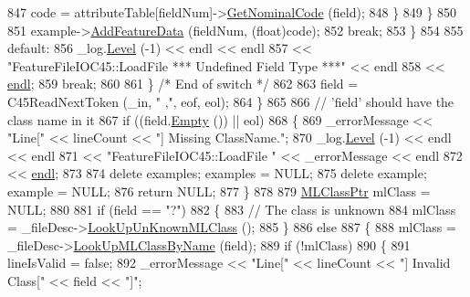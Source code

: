 \begin{DoxyCode}
847             code = attributeTable[fieldNum]->\hyperlink{class_k_k_m_l_l_1_1_attribute_adc5bad6931d6c3f4aea6e1ad5c42b1f1}{GetNominalCode} (field);
848           \}
849         \}
850 
851         example->\hyperlink{class_k_k_m_l_l_1_1_feature_vector_abf364e3348c041cd7be6f14d6c4567cf}{AddFeatureData} (fieldNum, (\textcolor{keywordtype}{float})code);
852         \textcolor{keywordflow}{break};
853       \}
854 
855       \textcolor{keywordflow}{default}:
856         \_log.\hyperlink{class_k_k_b_1_1_run_log_a32cf761d7f2e747465fd80533fdbb659}{Level} (-1) << endl << endl
857                         << \textcolor{stringliteral}{"FeatureFileIOC45::LoadFile    *** Undefined Field Type ***"} << endl
858                         << \hyperlink{namespace_k_k_b_ad1f50f65af6adc8fa9e6f62d007818a8}{endl};
859         \textcolor{keywordflow}{break};
860 
861       \}  \textcolor{comment}{/* End of switch */}
862 
863       field = C45ReadNextToken (\_in, \textcolor{stringliteral}{" ,"}, eof, eol);
864     \}
865 
866     \textcolor{comment}{// 'field' should have the class name in it}
867     \textcolor{keywordflow}{if}  ((field.\hyperlink{class_k_k_b_1_1_k_k_str_ac69942f73fffd672ec2a6e1c410afdb6}{Empty} ())  ||  eol)
868     \{
869       \_errorMessage << \textcolor{stringliteral}{"Line["} << lineCount << \textcolor{stringliteral}{"]  Missing ClassName."};
870       \_log.\hyperlink{class_k_k_b_1_1_run_log_a32cf761d7f2e747465fd80533fdbb659}{Level} (-1) << endl << endl 
871                       << \textcolor{stringliteral}{"FeatureFileIOC45::LoadFile    "} << \_errorMessage << endl
872                       << \hyperlink{namespace_k_k_b_ad1f50f65af6adc8fa9e6f62d007818a8}{endl};
873       
874       \textcolor{keyword}{delete}  examples;  examples = NULL;
875       \textcolor{keyword}{delete}  example;   example  = NULL;
876       \textcolor{keywordflow}{return}  NULL;
877     \}
878     
879     \hyperlink{class_k_k_m_l_l_1_1_m_l_class}{MLClassPtr} mlClass = NULL;
880 
881     \textcolor{keywordflow}{if}  (field == \textcolor{stringliteral}{"?"})
882     \{
883       \textcolor{comment}{// The class is unknown}
884       mlClass = \_fileDesc->\hyperlink{class_k_k_m_l_l_1_1_file_desc_af14b8f9f30c5f9114af2de14a7f8a5b2}{LookUpUnKnownMLClass} ();
885     \}
886     \textcolor{keywordflow}{else}
887     \{
888       mlClass = \_fileDesc->\hyperlink{class_k_k_m_l_l_1_1_file_desc_a69d8dc46e426180993f75ca3b0abcc96}{LookUpMLClassByName} (field);
889       \textcolor{keywordflow}{if}  (!mlClass)
890       \{
891         lineIsValid = \textcolor{keyword}{false};
892         \_errorMessage << \textcolor{stringliteral}{"Line["} << lineCount << \textcolor{stringliteral}{"]  Invalid Class["} << field << \textcolor{stringliteral}{"]"};

\end{DoxyCode}
